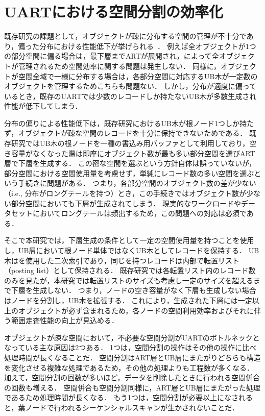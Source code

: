 \chapter{UARTにおける空間分割の効率化}

既存研究の課題として，オブジェクトが疎に分布する空間の管理が不十分であり，偏った分布における性能低下が挙げられる~\cite{deim:Suzuki2023}．
例えば全オブジェクトが1つの部分空間に偏る場合は，最下層までARTが展開され，\BTree によって全オブジェクトが管理されるため空間効率に関する問題は発生しない．
同様に，オブジェクトが空間全域で一様に分布する場合は，各部分空間に対応するUB木が一定数のオブジェクトを管理するためこちらも問題ない．
しかし，分布が適度に偏っているとき，既存のUARTでは少数のレコードしか持たないUB木が多数生成され性能が低下してしまう．

分布の偏りによる性能低下は，既存研究におけるUB木が根ノード1つしか持たず，オブジェクトが疎な空間のレコードを十分に保持できないためである．
既存研究ではUB木の根ノードを一種の書込み用バッファとして利用しており，空き容量がなくなった際は即座にオブジェクト数が最も多い部分空間を選びART層で下層を生成する．
この密な空間を選ぶという方針自体は誤っていないが，部分空間における空間使用量を考慮せず，単純にレコード数の多い空間を選ぶという手続きに問題がある．
つまり，各部分空間のオブジェクト数の差が少ない（i.e., 分布がロングテールを持つ）とき，この手続きではオブジェクト数が少ない部分空間においても下層が生成されてしまう．
現実的なワークロードやデータセットにおいてロングテールは頻出するため，この問題への対応は必須である．

そこで本研究では，下層生成の条件として一定の空間使用量を持つことを使用し，UB層において根ノード単体ではなくUB木としてレコードを保持する．
UB木は\ZValue を使用した二次索引であり，同じ\ZValue を持つレコードは内部で転置リスト（posting list）として保持される．
既存研究では各転置リスト内のレコード数のみを見たが，本研究では転置リストのサイズも考慮し一定のサイズを超えるまで下層を生成しない．
つまり，ノードの空き容量がなく下層も生成しない場合はノードを分割し，UB木を拡張する．
これにより，生成された下層には一定以上のオブジェクトが必ず含まれるため，各ノードの空間利用効率およびそれに伴う範囲走査性能の向上が見込める．

オブジェクトが疎な空間において，不必要な空間分割がUARTのボトルネックとなっている主な原因は2つある．
1つは，空間分割の操作はその他の操作に比べ処理時間が長くなることだ．
空間分割はART層とUB層にまたがりどちらも構造を変化させる複雑な処理であるため，その他の処理よりも工程数が多くなる．
加えて，空間分割の回数が多いほど，データを削除したときに行われる空間併合の回数も増える．
空間併合も空間分割同様に，ART層とUB層にまたがった処理であるため処理時間が長くなる．
もう1つは，空間分割が必要以上になされると，葉ノードで行われるシーケンシャルスキャンが生かされないことだ．




